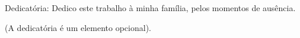 Dedicatória: Dedico este trabalho à minha família, pelos momentos de ausência.

(A dedicatória é um elemento opcional).